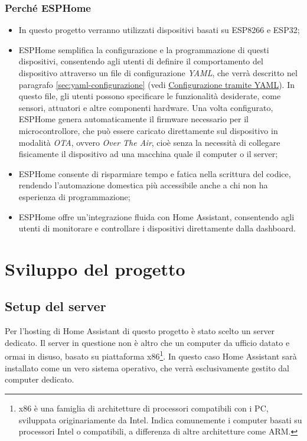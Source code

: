 \documentclass[11pt, a4paper]{article}
\begin{document}
\subsubsection{Perché ESPHome}
\begin{itemize}
    \item In questo progetto verranno utilizzati dispositivi basati su ESP8266 e ESP32;
    \item ESPHome semplifica la configurazione e la programmazione di questi dispositivi, 
    consentendo agli utenti di definire il comportamento del dispositivo attraverso un file di configurazione \textit{YAML},
    che verrà descritto nel paragrafo 
    \ref{sec:yaml-configurazione} (vedi \hyperref[sec:yaml-configurazione]{Configurazione tramite YAML}).
    In questo file, gli utenti possono specificare le funzionalità desiderate, come sensori, attuatori e altre componenti hardware. 
    Una volta configurato, ESPHome genera automaticamente il firmware necessario per il microcontrollore, che può essere caricato
    direttamente sul dispositivo in modalità \textit{OTA}, ovvero \textit{Over The Air}, cioè senza la necessità di collegare 
    fisicamente il dispositivo ad una macchina quale il computer o il server;
    \item ESPHome consente di risparmiare tempo e fatica nella scrittura del codice, rendendo 
            l'automazione domestica più accessibile anche a chi non ha esperienza di programmazione;
    \item ESPHome offre un'integrazione fluida con Home Assistant, consentendo agli utenti di 
            monitorare e controllare i dispositivi direttamente dalla dashboard.

\end{itemize}

\section{Sviluppo del progetto}

\subsection{Setup del server}
Per l'hosting di Home Assistant di questo progetto è stato scelto un server dedicato.
Il server in questione non è altro che un computer da ufficio datato e ormai in disuso, basato su
piattaforma x86\footnote{x86 è una famiglia di architetture di processori 
compatibili con i PC, sviluppata originariamente da Intel. Indica comunemente 
i computer basati su processori Intel o compatibili, a differenza di altre architetture come ARM.}.
In questo caso Home Assistant sarà installato come un vero sistema operativo, che verrà esclusivamente
gestito dal computer dedicato.
\end{document}
